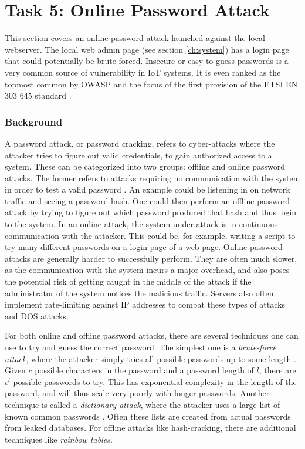\section{Task 5: Online Password Attack} \label{ch:pentesting:password}
This section covers an online password attack launched against the local webserver. The local web admin page (see section \ref{ch:system}) has a login page that could potentially be brute-forced. Insecure or easy to guess passwords is a very common source of vulnerability in IoT systems. It is even ranked as the topmost common by OWASP \cite{owasp-iot-top10} and the focus of the first provision of the ETSI EN 303 645 standard \cite{etsi-iot-standard}.

\subsubsection{Background}
A password attack, or password cracking, refers to cyber-attacks where the attacker tries to figure out valid credentials, to gain authorized access to a system. These can be categorized into two groups: offline and online password attacks. The former refers to attacks requiring no communication with the system in order to test a valid password \cite{password-attack-survey}. An example could be listening in on network traffic and seeing a password hash. One could then perform an offline password attack by trying to figure out which password produced that hash and thus login to the system. In an online attack, the system under attack is in continuous communication with the attacker. This could be, for example, writing a script to try many different passwords on a login page of a web page. Online password attacks are generally harder to successfully perform. They are often much slower, as the communication with the system incurs a major overhead, and also poses the potential risk of getting caught in the middle of the attack if the administrator of the system notices the malicious traffic. Servers also often implement rate-limiting against IP addresses to combat these types of attacks and DOS attacks.

For both online and offline password attacks, there are several techniques one can use to try and guess the correct password. The simplest one is a \textit{brute-force attack}, where the attacker simply tries all possible passwords up to some length \cite{password-attack-survey}. Given $c$ possible characters in the password and a password length of $l$, there are $c^l$ possible passwords to try. This has exponential complexity in the length of the password, and will thus scale very poorly with longer passwords. Another technique is called a \textit{dictionary attack}, where the attacker uses a large list of known common passwords \cite{password-attack-survey}. Often these lists are created from actual passwords from leaked databases. For offline attacks like hash-cracking, there are additional techniques like \textit{rainbow tables}.

